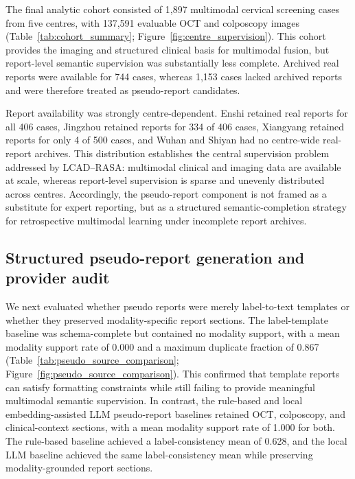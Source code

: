 The final analytic cohort consisted of 1,897 multimodal cervical screening cases from five centres, with 137,591 evaluable OCT and colposcopy images (Table~\ref{tab:cohort_summary}; Figure~\ref{fig:centre_supervision}). This cohort provides the imaging and structured clinical basis for multimodal fusion, but report-level semantic supervision was substantially less complete. Archived real reports were available for 744 cases, whereas 1,153 cases lacked archived reports and were therefore treated as pseudo-report candidates.

Report availability was strongly centre-dependent. Enshi retained real reports for all 406 cases, Jingzhou retained reports for 334 of 406 cases, Xiangyang retained reports for only 4 of 500 cases, and Wuhan and Shiyan had no centre-wide real-report archives. This distribution establishes the central supervision problem addressed by LCAD--RASA: multimodal clinical and imaging data are available at scale, whereas report-level supervision is sparse and unevenly distributed across centres. Accordingly, the pseudo-report component is not framed as a substitute for expert reporting, but as a structured semantic-completion strategy for retrospective multimodal learning under incomplete report archives.

\subsection{Structured pseudo-report generation and provider audit}
\label{subsec:pseudo_report_results}

We next evaluated whether pseudo reports were merely label-to-text templates or whether they preserved modality-specific report sections. The label-template baseline was schema-complete but contained no modality support, with a mean modality support rate of 0.000 and a maximum duplicate fraction of 0.867 (Table~\ref{tab:pseudo_source_comparison}; Figure~\ref{fig:pseudo_source_comparison}). This confirmed that template reports can satisfy formatting constraints while still failing to provide meaningful multimodal semantic supervision. In contrast, the rule-based and local embedding-assisted LLM pseudo-report baselines retained OCT, colposcopy, and clinical-context sections, with a mean modality support rate of 1.000 for both. The rule-based baseline achieved a label-consistency mean of 0.628, and the local LLM baseline achieved the same label-consistency mean while preserving modality-grounded report sections.

